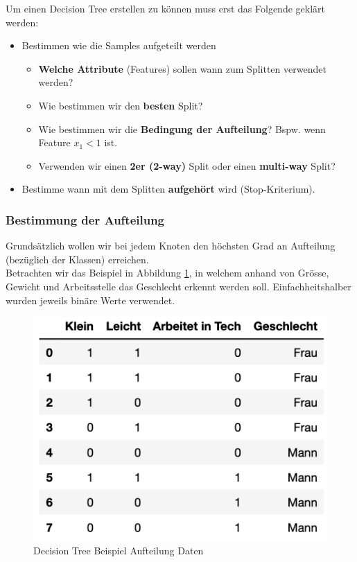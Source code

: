 Um einen Decision Tree erstellen zu können muss erst das Folgende geklärt werden:
\begin{itemize}
	\item Bestimmen wie die Samples aufgeteilt werden
	\begin{itemize}
		\item \textbf{Welche Attribute} (Features) sollen wann zum Splitten verwendet werden?
		\item Wie bestimmen wir den \textbf{besten} Split?
		\item Wie bestimmen wir die \textbf{Bedingung der Aufteilung}? Bspw. wenn Feature $x_{1} < 1$ ist.
		\item Verwenden wir einen \textbf{2er (2-way)} Split oder einen \textbf{multi-way} Split?
	\end{itemize} 
	\item Bestimme wann mit dem Splitten \textbf{aufgehört} wird (Stop-Kriterium).
\end{itemize} 

\subsubsection{Bestimmung der Aufteilung}

Grundsätzlich wollen wir bei jedem Knoten den höchsten Grad an Aufteilung (bezüglich der Klassen) erreichen. \\

Betrachten wir das Beispiel in Abbildung \ref{fig:dt_split_data}, in welchem anhand von Grösse, Gewicht und Arbeitsstelle das Geschlecht erkennt werden soll. Einfachheitshalber wurden jeweils binäre Werte verwendet.

\begin{figure}[h!]
	\includegraphics[scale=0.8]{figures/decision_tree_ex1_data}
	\caption{Decision Tree Beispiel Aufteilung Daten}
	\label{fig:dt_split_data}
\end{figure}

